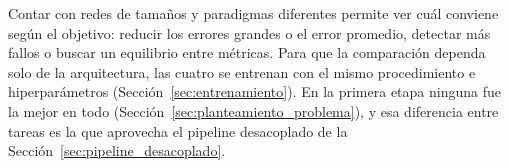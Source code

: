 \documentclass{report}
\begin{document}
Contar con redes de tamaños y paradigmas diferentes permite ver cuál conviene según el objetivo: reducir los errores grandes o el error promedio, detectar más fallos o buscar un equilibrio entre métricas. Para que la comparación dependa solo de la arquitectura, las cuatro se entrenan con el mismo procedimiento e hiperparámetros (Sección~\ref{sec:entrenamiento}). En la primera etapa ninguna fue la mejor en todo (Sección~\ref{sec:planteamiento_problema}), y esa diferencia entre tareas es la que aprovecha el pipeline desacoplado de la Sección~\ref{sec:pipeline_desacoplado}.

\end{document}
